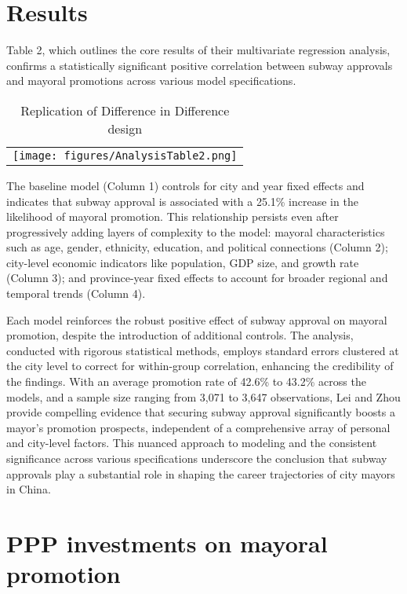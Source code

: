 \documentclass[12pt, ]{article}
\begin{document}
\hypertarget{results}{%
\section{Results}\label{results}}

Table 2, which outlines the core results of their multivariate
regression analysis, confirms a statistically significant positive
correlation between subway approvals and mayoral promotions across
various model specifications.

\hypertarget{tbl-main}{}
\begin{longtable}[]{@{}l@{}}
\caption{\label{tbl-main}Replication of \citet{lei2022private}
Difference in Difference design}\tabularnewline
\toprule\noalign{}
\endfirsthead
\endhead
\bottomrule\noalign{}
\endlastfoot
\texttt{[image: figures/AnalysisTable2.png]} \\
\end{longtable}

The baseline model (Column 1) controls for city and year fixed effects
and indicates that subway approval is associated with a 25.1\% increase
in the likelihood of mayoral promotion. This relationship persists even
after progressively adding layers of complexity to the model: mayoral
characteristics such as age, gender, ethnicity, education, and political
connections (Column 2); city-level economic indicators like population,
GDP size, and growth rate (Column 3); and province-year fixed effects to
account for broader regional and temporal trends (Column 4).

Each model reinforces the robust positive effect of subway approval on
mayoral promotion, despite the introduction of additional controls. The
analysis, conducted with rigorous statistical methods, employs standard
errors clustered at the city level to correct for within-group
correlation, enhancing the credibility of the findings. With an average
promotion rate of 42.6\% to 43.2\% across the models, and a sample size
ranging from 3,071 to 3,647 observations, Lei and Zhou provide
compelling evidence that securing subway approval significantly boosts a
mayor's promotion prospects, independent of a comprehensive array of
personal and city-level factors. This nuanced approach to modeling and
the consistent significance across various specifications underscore the
conclusion that subway approvals play a substantial role in shaping the
career trajectories of city mayors in China.

\hypertarget{ppp-investments-on-mayoral-promotion}{%
\section{PPP investments on mayoral
promotion}\label{ppp-investments-on-mayoral-promotion}}
\end{document}
